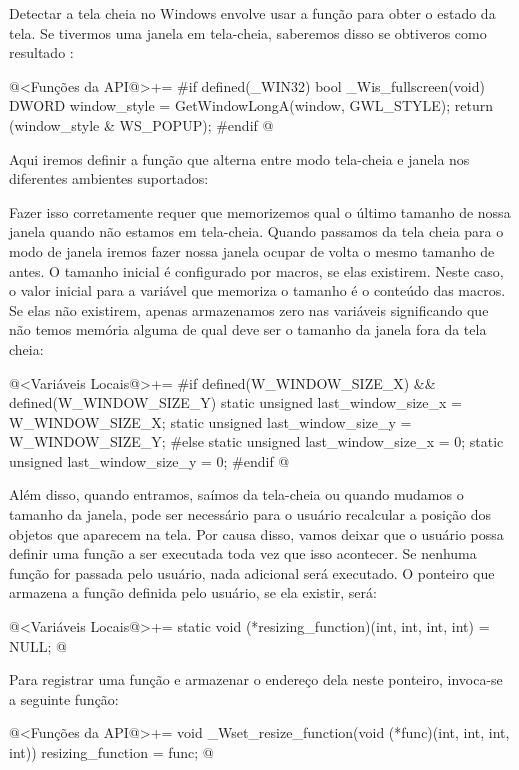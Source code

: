 Detectar a tela cheia no Windows envolve usar a
função  para obter o estado
da tela. Se tivermos uma janela em tela-cheia, saberemos disso se
obtiveros como resultado :

\iniciocodigo
@<Funções da API@>+=
#if defined(_WIN32)
bool _Wis_fullscreen(void){
  DWORD window_style = GetWindowLongA(window, GWL_STYLE);
  return (window_style & WS_POPUP);
}
#endif
@



Aqui iremos definir a função que alterna entre modo tela-cheia e
janela nos diferentes ambientes suportados:

Fazer isso corretamente requer que memorizemos qual o último tamanho
de nossa janela quando não estamos em tela-cheia. Quando passamos da
tela cheia para o modo de janela iremos fazer nossa janela ocupar de
volta o mesmo tamanho de antes. O tamanho inicial é configurado por
macros, se elas existirem. Neste caso, o valor inicial para a variável
que memoriza o tamanho é o conteúdo das macros. Se elas não existirem,
apenas armazenamos zero nas variáveis significando que não temos
memória alguma de qual deve ser o tamanho da janela fora da tela
cheia:

\iniciocodigo
@<Variáveis Locais@>+=
#if defined(W_WINDOW_SIZE_X) && defined(W_WINDOW_SIZE_Y)
static unsigned last_window_size_x = W_WINDOW_SIZE_X;
static unsigned last_window_size_y = W_WINDOW_SIZE_Y;
#else
static unsigned last_window_size_x = 0;
static unsigned last_window_size_y = 0;
#endif
@
\fimcodigo

Além disso, quando entramos, saímos da tela-cheia ou quando mudamos o
tamanho da janela, pode ser necessário para o usuário recalcular a
posição dos objetos que aparecem na tela. Por causa disso, vamos
deixar que o usuário possa definir uma função a ser executada toda vez
que isso acontecer. Se nenhuma função for passada pelo usuário, nada
adicional será executado. O ponteiro que armazena a função definida
pelo usuário, se ela existir, será:

\iniciocodigo
@<Variáveis Locais@>+=
static void (*resizing_function)(int, int, int, int) = NULL;
@
\fimcodigo

Para registrar uma função e armazenar o endereço dela neste ponteiro,
invoca-se a seguinte função:

\iniciocodigo
@<Funções da API@>+=
void _Wset_resize_function(void (*func)(int, int, int, int)){
  resizing_function = func;
}
@
\fimcodigo

